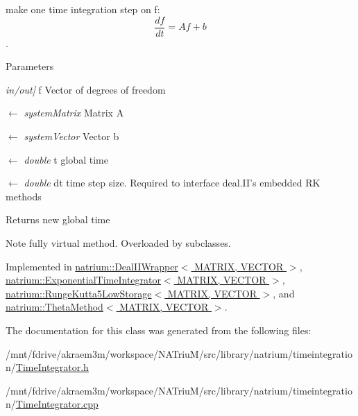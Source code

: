 make one time integration step on f: \[ \frac{df}{dt} = Af+b \]. 
\begin{DoxyParams}{Parameters}
\item[{\em in/out\mbox{]}}]f Vector of degrees of freedom \item[\mbox{$\leftarrow$} {\em systemMatrix}]Matrix A \item[\mbox{$\leftarrow$} {\em systemVector}]Vector b \item[\mbox{$\leftarrow$} {\em double}]t global time \item[\mbox{$\leftarrow$} {\em double}]dt time step size. Required to interface deal.II's embedded RK methods \end{DoxyParams}
\begin{DoxyReturn}{Returns}
new global time 
\end{DoxyReturn}
\begin{DoxyNote}{Note}
fully virtual method. Overloaded by subclasses. 
\end{DoxyNote}


Implemented in \hyperlink{classnatrium_1_1DealIIWrapper_a50227545e1fcff4c2d0f10a9c6eb3bca}{natrium::DealIIWrapper$<$ MATRIX, VECTOR $>$}, \hyperlink{classnatrium_1_1ExponentialTimeIntegrator_a656810a85c20b5f7eae422ee596fc340}{natrium::ExponentialTimeIntegrator$<$ MATRIX, VECTOR $>$}, \hyperlink{classnatrium_1_1RungeKutta5LowStorage_a90a1bec53a8fd458a190d3e9f8c78478}{natrium::RungeKutta5LowStorage$<$ MATRIX, VECTOR $>$}, and \hyperlink{classnatrium_1_1ThetaMethod_a25fb9b235e61a96de76139919d7fbbfe}{natrium::ThetaMethod$<$ MATRIX, VECTOR $>$}.

The documentation for this class was generated from the following files:\begin{DoxyCompactItemize}
\item 
/mnt/fdrive/akraem3m/workspace/NATriuM/src/library/natrium/timeintegration/\hyperlink{TimeIntegrator_8h}{TimeIntegrator.h}\item 
/mnt/fdrive/akraem3m/workspace/NATriuM/src/library/natrium/timeintegration/\hyperlink{TimeIntegrator_8cpp}{TimeIntegrator.cpp}\end{DoxyCompactItemize}
